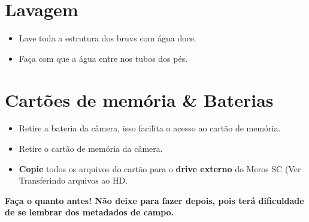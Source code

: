 \documentclass[
  12pt,
  letterpaper,
  DIV=11,
  numbers=noendperiod]{scrreprt}
\begin{document}
\section{Lavagem}\label{lavagem}

\begin{itemize}
\item
  Lave toda a estrutura dos bruvs com água doce.
\item
  Faça com que a água entre nos tubos dos pés.
\end{itemize}

\section{Cartões de memória \&
Baterias}\label{cartuxf5es-de-memuxf3ria-baterias}

\begin{itemize}
\item
  Retire a bateria da câmera, isso facilita o acesso ao cartão de
  memória.
\item
  Retire o cartão de memória da câmera.
\item
  \textbf{Copie} todos os arquivos do cartão para o \textbf{drive
  externo} do Meros SC (Ver Transferindo arquivos ao HD.
\end{itemize}

\begin{tcolorbox}[enhanced jigsaw, breakable, rightrule=.15mm, colback=white, bottomrule=.15mm, opacitybacktitle=0.6, left=2mm, coltitle=black, leftrule=.75mm, toptitle=1mm, toprule=.15mm, bottomtitle=1mm, titlerule=0mm, title=\textcolor{quarto-callout-tip-color}{\faLightbulb}\hspace{0.5em}{Tip}, colframe=quarto-callout-tip-color-frame, arc=.35mm, colbacktitle=quarto-callout-tip-color!10!white, opacityback=0]

\textbf{Faça o quanto antes! Não deixe para fazer depois, pois terá
dificuldade de se lembrar dos metadados de campo.}

\end{tcolorbox}
\end{document}
